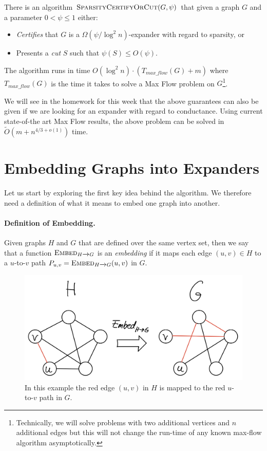 \begin{theorem}
There is an algorithm $\textsc{SparsityCertifyOrCut}(G, \psi)$ that given a graph $G$ and a parameter $0 <\psi \leq 1$ either: 
\begin{itemize}
    \item \emph{Certifies} that $G$ is a $\Omega(\psi/\log^2 n)$-expander with regard to sparsity, or
    \item Presents a \emph{cut} $S$ such that $\psi(S) \leq O(\psi)$.
\end{itemize}
The algorithm runs in time $O(\log^2 n) \cdot (T_{max\_flow}(G) + m)$ where $T_{max\_flow}(G)$ is the time it takes to solve a Max Flow problem on $G$\footnote{Technically, we will solve problems with two additional vertices and $n$ additional edges but this will not change the run-time of any known max-flow algorithm asymptotically.}.
\end{theorem}

We will see in the homework for this week that the above guarantees can also be given if we are looking for an expander with regard to conductance. Using current state-of-the art Max Flow results, the above problem can be solved in $\tilde{O}(m + n^{4/3+o(1)})$ time. 

\section{Embedding Graphs into Expanders}

Let us start by exploring the first key idea behind the algorithm. We therefore need a definition of what it means to embed one graph into another.

\paragraph{Definition of Embedding.} Given graphs $H$ and $G$ that are defined over the same vertex set, then we say that a function $\textsc{Embed}_{H \xrightarrow{} G}$ is an \emph{embedding} if it maps each edge $(u,v) \in H$ to a $u$-to-$v$ path $P_{u,v} = \textsc{Embed}_{H \xrightarrow{} G}(u,v)$ in $G$. 
\begin{figure}[!ht]
    \centering
    \includegraphics[scale=0.2]{./fig/embedGraph_lectureCutMatching.jpeg}
    \caption{In this example the red edge $(u,v)$ in $H$ is mapped to the red $u$-to-$v$ path in $G$.}
    \label{fig:my_label}
\end{figure}


